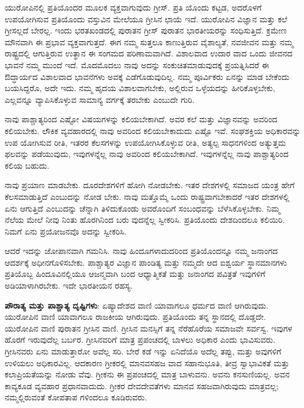 ಯುರೋಪಿನಲ್ಲಿ ಪ್ರತಿಯೊಂದರ ಮೂಲಕ ವ್ಯಕ್ತವಾಗುವುದು ಗ್ರೀಸ್. ಪ್ರತಿ ಯೊಂದು ಕಟ್ಟಡ, ಅದರೊಳಗೆ ಉಪಯೋಗಿಸುವ ಪ್ರತಿಯೊಂದು ವಸ್ತುವಿನ ಮೇಲೆಯೂ ಗ್ರೀಸಿನ ಛಾಯೆ ಇದೆ. ಯುರೋಪಿನ ವಿಜ್ಞಾನ ಮತ್ತು ಕಲೆ ಗ್ರೀಸಲ್ಲದೆ ಬೇರಲ್ಲ. ಇಂದು ಭರತಖಂಡದಲ್ಲಿ ಪುರಾತನ ಗ್ರೀಸ್ ಪುರಾತನ ಭಾರತೀಯರನ್ನು ಸಂಧಿಸುತ್ತಿದೆ. ಕ್ರಮೇಣ ಮೌನವಾಗಿ ಈ ಪ್ರಭಾವ ವ್ಯಕ್ತವಾಗುತ್ತದೆ. ಈಗ ನಮ್ಮ ಸುತ್ತಲೂ ಕಾಣುತ್ತಿರುವ ವೈಶಾಲ್ಯತೆ, ನವಜೀವನ ಮತ್ತು ನಮ್ಮ ರಾಷ್ಟ್ರದಲ್ಲಿ ಆಗುತ್ತಿರುವ ಉತ್ಥಾನ ಈ ಸಂಗಮದ ಪರಿಣಾಮವಾಗಿದೆ. ವಿಶಾಲವಾದ ಉದಾರ ವಾದ ಒಂದು ಜೀವನದ ಭಾವನೆ ನಮ್ಮ ಮುಂದೆ ಇದೆ. ಮೊದಮೊದಲು ನಾವು ಅದನ್ನು ಸಂಕುಚಿತಮಾಡುವುದಕ್ಕೆ ಪ್ರಯತ್ನಿಸಿದರೆ ಈ ಔದ್ಧಾರ್ಯದ ವಿಶಾಲವಾದ ಭಾವನೆಗಳು ಅವಕ್ಕೆ ಎಡೆಗೊಡುವುದಿಲ್ಲ. ನಮ್ಮ ಪೂರ್ವಿಕರು ಏನನ್ನು ಮಾಡ ಬೇಕೆಂದು ಬಯಸಿದ್ದರೊ, ಅದೇ ಇದು. ನಮ್ಮ ಹೃದಯ ವಿಶಾಲವಾಗಬೇಕು, ಅಲ್ಲಿರುವ ಒಳ್ಳೆಯದನ್ನು ಹೀರಿಕೊಳ್ಳಬೇಕು, ಎಲ್ಲವನ್ನೂ ವ್ಯಾಪಿಸಿಕೊಳ್ಳುವ ಸಾಮಾನ್ಯ ವರ್ಗಕ್ಕೆ ತರಬೇಕು ಎಂಬುದೇ ಗುರಿ.

ನಾವು ಪಾಶ್ಚಾತ್ಯರಿಂದ ಎಷ್ಟೋ ವಿಷಯಗಳನ್ನು ಕಲಿಯಬೇಕಾಗಿದೆ. ಅವರ ಕಲೆ ಮತ್ತು ವಿಜ್ಞಾನವನ್ನು ಅವರಿಂದ ಕಲಿಯಬೇಕು. ಲೌಕಿಕ ವ್ಯವಹಾರದಲ್ಲಿ ನಾವು ಅವರಿಂದ ಕಲಿಯಬೇಕಾದುದು ಎಷ್ಟೊ ಇವೆ. ಸಂಘಶಕ್ತಿಯ ಅಧಿಕಾರವನ್ನು ಉಪ ಯೋಗಿಸುವ ರೀತಿ, ಇತರರ ಕೆಲಸಗಳನ್ನು ಉಪಯೋಗಿಸಿಕೊಳ್ಳುವ ರೀತಿ, ಅತ್ಯಲ್ಪ ಸಾಧನಗಳಿಂದ ಅತ್ಯುತ್ತಮ ಫಲವನ್ನು ಪಡೆಯುವುದು, ಇವುಗಳನ್ನೆಲ್ಲ ನಾವು ಅವರಿಂದ ಕಲಿಯಬೇಕಾಗಿದೆ. ಇವುಗಳನ್ನೆಲ್ಲ ನಾವು ಪಾಶ್ಚಾತ್ಯರಿಂದ ಕಲಿಯ ಬಹುದು.

ನಾವು ಪ್ರಯಾಣ ಮಾಡಬೇಕು. ದೂರದೇಶಗಳಿಗೆ ಹೋಗಿ ನೋಡಬೇಕು. ಇತರ ದೇಶಗಳಲ್ಲಿ ಸಮಾಜದ ಯಂತ್ರ ಹೇಗೆ ಕೆಲಸಮಾಡುತ್ತಿದೆ ಎಂಬುದನ್ನು ನೋಡ ಬೇಕು. ನಾವು ಮತ್ತೊಮ್ಮೆ ಒಂದು ರಾಷ್ಟ್ರವಾಗಬೇಕಾದರೆ ಇತರ ದೇಶಗಳಲ್ಲಿ ಏನು ಆಗುತ್ತಿದೆ ಎಂಬುದನ್ನು ಚೆನ್ನಾಗಿ ತಿಳಿದುಕೊಂಡು ಅವರೊಂದಿಗೆ ಸಂಬಂಧವನ್ನು ಬೆಳೆಸಿಕೊಳ್ಳಬೇಕು. ನಿಮ್ಮ ನೆಲೆಯ ಮೇಲೆ ನೀವು ನಿಂತು ಹೊರಗಿನಿಂದ ಬರು ವುದನ್ನೆಲ್ಲ ಸ್ವೀಕರಿಸಿ. ಪ್ರತಿಯೊಂದು ದೇಶದಿಂದಲೂ ಕಲಿಯಿರಿ. ನಿಮಗೆ ಏನು ಪ್ರಯೋಜನವೊ ಅದನ್ನು ಸ್ವೀಕರಿಸಿ.

ಆದರೆ ಇದನ್ನು ಜೋಪಾನವಾಗಿ ಗಮನಿಸಿ. ನಾವು ಹಿಂದೂಗಳಾದುದರಿಂದ ಪ್ರತಿಯೊಂದನ್ನೂ ನಮ್ಮ ಜನಾಂಗದ ಆದರ್ಶಕ್ಕೆ ಅಧೀನಗೊಳಿಸಬೇಕು. ಪಾಶ್ಚಾತ್ಯರ ವಿಜ್ಞಾನ ಪಾಂಡಿತ್ಯ ಮತ್ತು ನಮ್ಮದೇ ಆದ ಐಶ್ವರ್ಯ ಸ್ಥಾನಮಾನಗಳು ಪ್ರತಿಯೊಬ್ಬ ಹಿಂದೂವಿನಲ್ಲಿಯೂ ಆಜನ್ಮವಾಗಿ ಬಂದ ಆಧ್ಯಾತ್ಮಿಕತೆ ಮತ್ತು ಜನಾಂಗದ ಪವಿತ್ರತೆ ಇವುಗಳಿಗೆ ಅಡಿಯಾಳಾಗಿರಬೇಕು. ಇದೇ ಭಾರತೀಯನ ರಹಸ್ಯ.

\textbf{ಪೌರಾತ್ಯ ಮತ್ತು ಪಾಶ್ಚಾತ್ಯ ದೃಷ್ಟಿಗಳು}: ಏಷ್ಯಾದೇಶದ ವಾಣಿ ಯಾವಾಗಲೂ ಧರ್ಮದ ವಾಣಿ ಆಗಿರುವುದು. ಯುರೋಪಿನ ವಾಣಿ ಯಾವಾಗಲೂ ರಾಜಕೀಯ ಆಗಿರುವುದು. ಪ್ರತಿಯೊಂದು ತನ್ನ ಸ್ಥಾನದಲ್ಲಿ ದೊಡ್ಡದೇ. ಯುರೋಪಿನ ವಾಣಿ ಪುರಾತನ ಗ್ರೀಸಿನ ವಾಣಿ. ಗ್ರೀಸಿನ ಮನಸ್ಸಿಗೆ ತನ್ನ ನೆರೆಹೊರೆಯ ಸಮಾಜವೇ ಸರ್ವಸ್ವ. ಇವುಗಳ ಹೊರಗೆ ಇರುವುದೆಲ್ಲ ಬರ್ಬರ. ಗ್ರೀಸಿನವರಿಗೆ ಮಾತ್ರ ಪ್ರಪಂಚದಲ್ಲಿ ಬಾಳಲು ಅಧಿಕಾರ ಎಂದು ಭಾವಿಸುವರು. ಗ್ರೀಸಿನವರು ಏನು ಮಾಡುತ್ತಾರೋ ಅವೆಲ್ಲ ಸರಿ. ಬೇರೆ ಕಡೆ ಇನ್ನು ಏನಿದೆಯೊ ಅದೆಲ್ಲ ತಪ್ಪು, ಮತ್ತು ಅವುಗಳಿಗೆ ಉಳಿಯಲು ಅಧಿಕಾರವಿಲ್ಲ. ಆದಕಾರಣ ಗ್ರೀಕರಲ್ಲಿ ಮಾನವಸಹಜ ವಾದ ಸಹಾನುಭೂತಿ, ತೀವ್ರ ಸ್ವಾಭಾವಿಕತೆ ಮತ್ತು ಕಲಾಪ್ರಿಯತೆಯನ್ನು ನೋಡು ವೆವು. ಗ್ರೀಕನು ಈ ಪ್ರಪಂಚದಲ್ಲಿ ಮಾತ್ರ ಬಾಳುವನು. ಅವನು ಕನಸುಣಿಯಲ್ಲ. ಅವನ ಕಾವ್ಯಕೂಡ ವ್ಯವಹಾರ ಪ್ರಧಾನವಾದುದು. ಗ್ರೀಕರ ದೇವದೇವತೆಗಳು ಮಾನವ ಸಹಜವಾಗಿರುವುದು ಮಾತ್ರವಲ್ಲ; ನಮ್ಮಲ್ಲಿರುವಂತೆ ಕೋಪತಾಪ ಗಳಿಂದಲೂ ಕೂಡಿರುವರು.

